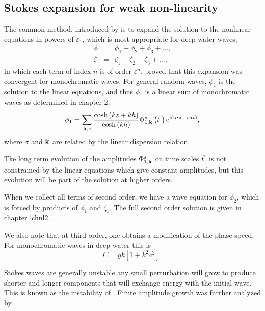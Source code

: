\subsection{Stokes expansion for weak non-linearity}
The common method, introduced by \cite{Stokes1880} is to expand the solution to the nonlinear equations in 
powers of $\varepsilon_1$, which is most appropriate for deep water waves, 
\begin{eqnarray}
\phi &=& \phi_{1}+  \phi_{2}+ \phi_{3}
    +..., \\
    \zeta &=& \zeta _{1}+ \zeta_{2}+ \zeta_{3}
    + ...,
    \label{power expansion}
\end{eqnarray}
in which each term of index $n$ is of order $\varepsilon^n$.
\cite{Levi-Civita1925} proved that this expansion was convergent for monochromatic waves. For general random waves, 
$\phi _{1}$ is the solution to the linear equations, and thus  $\phi_1$ is a 
linear sum of monochromatic waves as determined in chapter 2, %
\begin{equation}
    \phi _{1}=\sum_{\kb,s}\frac{\cosh \left( k z+k h\right) }{\cosh \left( kh\right) }
    \Phi _{1,\kb}^{s}\left(\skew4\widetilde{t} \; \right) \mathrm{e}^{\mathrm{i}
    \left(\kb\bcdot{\mathbf x} - s \sigma t\right)},
  \label{phi}
\end{equation}
where $\sigma$ and $\mathbf{k}$ are related by the linear dispersion relation. %

Tke long term evolution of the amplitudes $\Phi
_{1,\mathbf{k}}^{s}$ on time scales
$\skew4\widetilde{t} \;$ is not constrained by the linear equations which give constant amplitudes, but this evolution 
will be part of the solution at higher orders. 

When we collect all terms of second order, we have a wave equation for  $\phi_2$, which is forced by products of $\phi_1$ and $\zeta_1$. The full 
second order solution is given in chapter \ref{chnl2}. 


We also note that at third order, one obtains a modification of the phase speed. For monochromatic waves in deep water 
this is \citep{Stokes1880}
\begin{equation}
    C=gk \left[1+ k^2 a^2\right].
\end{equation}


Stokes waves are generally unstable any small perturbation will grow to produce shorter and longer components that will exchange 
energy with the initial wave. This is known as the instability of
\cite{Benjamin&Feir1967}. Finite amplitude growth was further analyzed by \cite{Chalikov2007}. 

